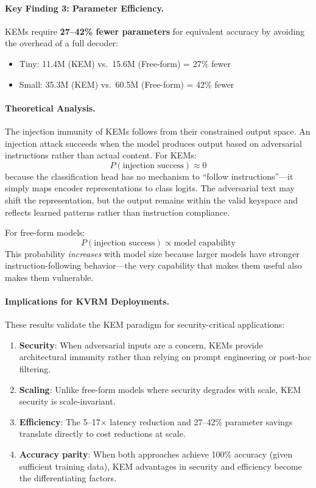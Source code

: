 \documentclass[11pt]{article}
\begin{document}
\paragraph{Key Finding 3: Parameter Efficiency.}
KEMs require \textbf{27--42\% fewer parameters} for equivalent accuracy by avoiding the overhead of a full decoder:
\begin{itemize}[leftmargin=*]
  \item Tiny: 11.4M (KEM) vs.\ 15.6M (Free-form) = 27\% fewer
  \item Small: 35.3M (KEM) vs.\ 60.5M (Free-form) = 42\% fewer
\end{itemize}

\paragraph{Theoretical Analysis.}
The injection immunity of KEMs follows from their constrained output space. An injection attack succeeds when the model produces output based on adversarial instructions rather than actual content. For KEMs:
\[
P(\text{injection success}) \approx 0
\]
because the classification head has no mechanism to ``follow instructions''---it simply maps encoder representations to class logits. The adversarial text may shift the representation, but the output remains within the valid keyspace and reflects learned patterns rather than instruction compliance.

For free-form models:
\[
P(\text{injection success}) \propto \text{model capability}
\]
This probability \emph{increases} with model size because larger models have stronger instruction-following behavior---the very capability that makes them useful also makes them vulnerable.

\paragraph{Implications for KVRM Deployments.}
These results validate the KEM paradigm for security-critical applications:
\begin{enumerate}[leftmargin=*]
  \item \textbf{Security}: When adversarial inputs are a concern, KEMs provide architectural immunity rather than relying on prompt engineering or post-hoc filtering.
  \item \textbf{Scaling}: Unlike free-form models where security degrades with scale, KEM security is scale-invariant.
  \item \textbf{Efficiency}: The 5--17$\times$ latency reduction and 27--42\% parameter savings translate directly to cost reductions at scale.
  \item \textbf{Accuracy parity}: When both approaches achieve 100\% accuracy (given sufficient training data), KEM advantages in security and efficiency become the differentiating factors.
\end{enumerate}
\end{document}
